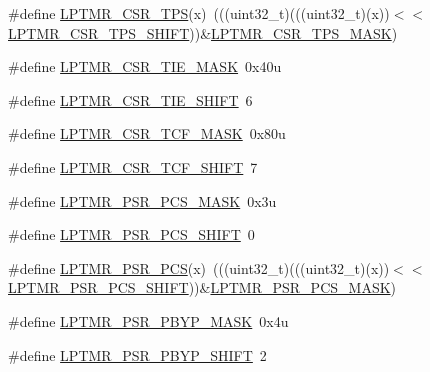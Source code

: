 \begin{DoxyCompactItemize}
\item 
\#define \hyperlink{group___l_p_t_m_r___register___masks_ga21ce2f3d05c087f7f46dcb9b7035e4f2}{L\+P\+T\+M\+R\+\_\+\+C\+S\+R\+\_\+\+T\+PS}(x)~(((uint32\+\_\+t)(((uint32\+\_\+t)(x))$<$$<$\hyperlink{group___l_p_t_m_r___register___masks_ga7759d842742bfedd91788d41ef12fb8d}{L\+P\+T\+M\+R\+\_\+\+C\+S\+R\+\_\+\+T\+P\+S\+\_\+\+S\+H\+I\+FT}))\&\hyperlink{group___l_p_t_m_r___register___masks_ga3502ccff1cbdb70bb99b73c035ab1e19}{L\+P\+T\+M\+R\+\_\+\+C\+S\+R\+\_\+\+T\+P\+S\+\_\+\+M\+A\+SK})
\item 
\#define \hyperlink{group___l_p_t_m_r___register___masks_gabb726cb43d5f6ee38339048c69a5f086}{L\+P\+T\+M\+R\+\_\+\+C\+S\+R\+\_\+\+T\+I\+E\+\_\+\+M\+A\+SK}~0x40u
\item 
\#define \hyperlink{group___l_p_t_m_r___register___masks_gaaedba0195b3abfcae6e8669f84f39d5d}{L\+P\+T\+M\+R\+\_\+\+C\+S\+R\+\_\+\+T\+I\+E\+\_\+\+S\+H\+I\+FT}~6
\item 
\#define \hyperlink{group___l_p_t_m_r___register___masks_ga13b5dd6085ca2a8cf0f06550b7557b6b}{L\+P\+T\+M\+R\+\_\+\+C\+S\+R\+\_\+\+T\+C\+F\+\_\+\+M\+A\+SK}~0x80u
\item 
\#define \hyperlink{group___l_p_t_m_r___register___masks_ga0ffa48fac670327deffc2e17ef1dea68}{L\+P\+T\+M\+R\+\_\+\+C\+S\+R\+\_\+\+T\+C\+F\+\_\+\+S\+H\+I\+FT}~7
\item 
\#define \hyperlink{group___l_p_t_m_r___register___masks_ga40daa10db43ec0c0a1944e6289ca29cc}{L\+P\+T\+M\+R\+\_\+\+P\+S\+R\+\_\+\+P\+C\+S\+\_\+\+M\+A\+SK}~0x3u
\item 
\#define \hyperlink{group___l_p_t_m_r___register___masks_gaf258bce874ad60601d6d76cefc72c52e}{L\+P\+T\+M\+R\+\_\+\+P\+S\+R\+\_\+\+P\+C\+S\+\_\+\+S\+H\+I\+FT}~0
\item 
\#define \hyperlink{group___l_p_t_m_r___register___masks_gabeba0b705770f53c56a569a5ee74536b}{L\+P\+T\+M\+R\+\_\+\+P\+S\+R\+\_\+\+P\+CS}(x)~(((uint32\+\_\+t)(((uint32\+\_\+t)(x))$<$$<$\hyperlink{group___l_p_t_m_r___register___masks_gaf258bce874ad60601d6d76cefc72c52e}{L\+P\+T\+M\+R\+\_\+\+P\+S\+R\+\_\+\+P\+C\+S\+\_\+\+S\+H\+I\+FT}))\&\hyperlink{group___l_p_t_m_r___register___masks_ga40daa10db43ec0c0a1944e6289ca29cc}{L\+P\+T\+M\+R\+\_\+\+P\+S\+R\+\_\+\+P\+C\+S\+\_\+\+M\+A\+SK})
\item 
\#define \hyperlink{group___l_p_t_m_r___register___masks_gab3daae6085cf702b31db5be78fe03872}{L\+P\+T\+M\+R\+\_\+\+P\+S\+R\+\_\+\+P\+B\+Y\+P\+\_\+\+M\+A\+SK}~0x4u
\item 
\#define \hyperlink{group___l_p_t_m_r___register___masks_ga4bb5021e396db697f5e597fdcdc222e3}{L\+P\+T\+M\+R\+\_\+\+P\+S\+R\+\_\+\+P\+B\+Y\+P\+\_\+\+S\+H\+I\+FT}~2

\end{DoxyCompactItemize}
